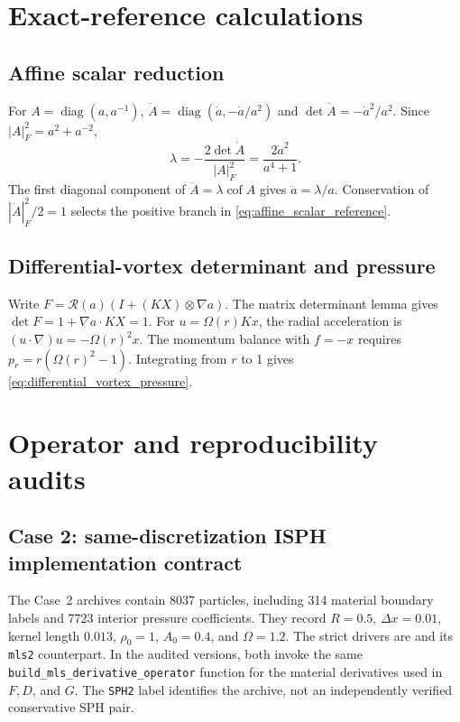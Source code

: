 \documentclass[11pt]{article}
\theoremstyle{plain}
\theoremstyle{definition}
\theoremstyle{remark}
\newcommand{\cof}{\operatorname{cof}}
\newcommand{\diag}{\operatorname{diag}}
\begin{document}
\appendix
\section{Exact-reference calculations}
\label{app:exact_references}

\subsection{Affine scalar reduction}

For $A=\diag(a,a^{-1})$,
$\dot A=\diag(\dot a,-\dot a/a^2)$ and
$\det\dot A=-\dot a^2/a^2$.  Since
$|A|_F^2=a^2+a^{-2}$,
\[
 \lambda=-\frac{2\det\dot A}{|A|_F^2}
 =\frac{2\dot a^2}{a^4+1}.
\]
The first diagonal component of $\ddot A=\lambda\cof A$ gives
$\ddot a=\lambda/a$.  Conservation of $|\dot A|_F^2/2=1$ selects the positive
branch in \eqref{eq:affine_scalar_reference}.

\subsection{Differential-vortex determinant and pressure}

Write
$F=\mathcal R(a)(I+(KX)\otimes\nabla a)$.  The matrix determinant lemma gives
$\det F=1+\nabla a\cdot KX=1$.  For
$u=\Omega(r)Kx$, the radial acceleration is
$(u\cdot\nabla)u=-\Omega(r)^2x$.  The momentum balance with $f=-x$ requires
$p_r=r(\Omega(r)^2-1)$.  Integrating from $r$ to 1 gives
\eqref{eq:differential_vortex_pressure}.

\section{Operator and reproducibility audits}

\subsection{Case 2: same-discretization ISPH implementation contract}
\label{sec:case2_implementation_contract}

The Case~2 archives contain 8037 particles, including 314 material boundary
labels and 7723 interior pressure coefficients.  They record $R=0.5$,
$\Delta x=0.01$, kernel length $0.013$, $\rho_0=1$, $A_0=0.4$, and
$\Omega=1.2$.  The strict drivers are
and its \texttt{mls2} counterpart.  In the audited versions, both invoke
the same \texttt{build\_mls\_derivative\_operator} function for the material
derivatives used in $F,D$, and $G$.  The \texttt{SPH2} label identifies the
archive, not an independently verified conservative SPH pair.
\end{document}
